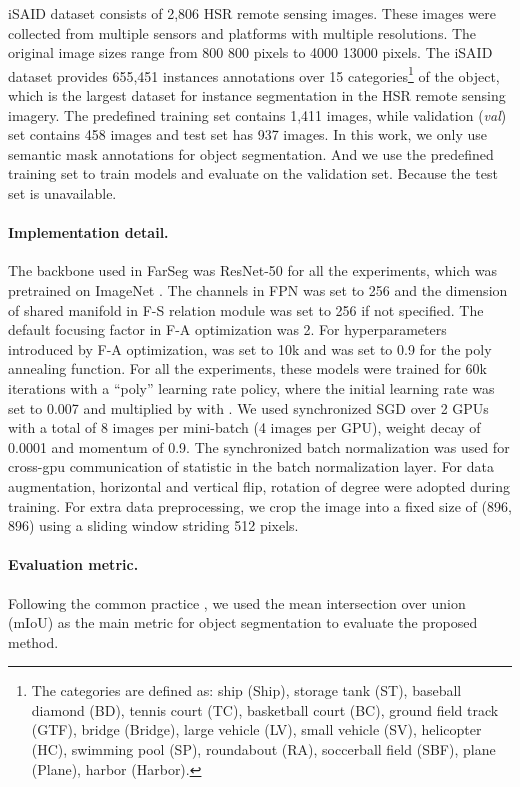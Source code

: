 \documentclass[10pt,twocolumn,letterpaper]{article}
\begin{document}
iSAID \cite{waqas2019isaid} dataset consists of 2,806 HSR remote sensing images.
These images were collected from multiple sensors and platforms with multiple resolutions.
The original image sizes range from  800  800 pixels to  4000  13000 pixels.
The iSAID dataset provides 655,451 instances annotations over 15 categories\footnote{The categories are defined as: ship (Ship), storage tank (ST), baseball diamond (BD), tennis court (TC), basketball court (BC), ground field track (GTF), bridge (Bridge), large vehicle (LV), small vehicle (SV), helicopter (HC), swimming pool (SP), roundabout (RA), soccerball field (SBF), plane (Plane), harbor (Harbor).}
of the object, which is the largest dataset for instance segmentation in the HSR remote sensing imagery.
The predefined training set contains 1,411 images, while validation (\textit{val}) set contains 458 images and test set has 937 images.
In this work, we only use semantic mask annotations for object segmentation.
And we use the predefined training set to train models and evaluate on the validation set.
Because the test set is unavailable.


\paragraph{Implementation detail.}
The backbone used in FarSeg was ResNet-50 for all the experiments, which was pretrained on ImageNet \cite{deng2009imagenet}.
The channels  in FPN was set to 256 and the dimension of shared manifold  in F-S relation module was set to 256 if not specified.
The default focusing factor  in F-A optimization was 2.
For hyperparameters introduced by F-A optimization,  was set to 10k and  was set to 0.9 for the poly annealing function.
For all the experiments, these models were trained for 60k iterations with a ``poly'' learning rate policy, where the initial learning rate was set to 0.007 and multiplied by  with .
We used synchronized SGD over 2 GPUs with a total of 8 images per mini-batch (4 images per GPU), weight decay of 0.0001 and momentum of 0.9.
The synchronized batch normalization was used for cross-gpu communication of statistic in the batch normalization layer.
For data augmentation, horizontal and vertical flip, rotation of  degree were adopted during training.
For extra data preprocessing, we crop the image into a fixed size of (896, 896) using a sliding window striding 512 pixels.

\paragraph{Evaluation metric.}
Following the common practice \cite{everingham2015pascal, lin2014microsoft}, we used the mean intersection over union (mIoU) as the main metric for object segmentation to evaluate the proposed method.
\end{document}
